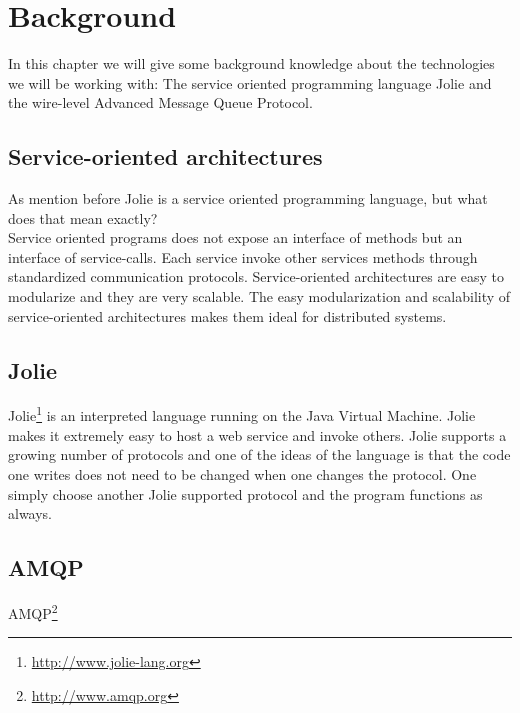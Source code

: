 \section{Background}
In this chapter we will give some background knowledge about the technologies we will be working with: The service oriented programming language Jolie and the wire-level Advanced Message Queue Protocol.
\subsection{Service-oriented architectures}
As mention before Jolie is a service oriented programming language, but what does that mean exactly?\\
Service oriented programs does not expose an interface of methods but an interface of service-calls. Each service invoke other services methods through standardized communication protocols. Service-oriented architectures are easy to modularize and they are very scalable. The easy modularization and scalability of service-oriented architectures makes them ideal for distributed systems.
\subsection{Jolie}
Jolie\footnote{\url{http://www.jolie-lang.org}} is an interpreted language running on the Java Virtual Machine. Jolie makes it extremely easy to host a web service and invoke others. Jolie supports a growing number of protocols and one of the ideas of the language is that the code one writes does not need to be changed when one changes the protocol. One simply choose another Jolie supported protocol and the program functions as always.
\subsection{AMQP}
AMQP\footnote{\url{http://www.amqp.org}}
\newpage